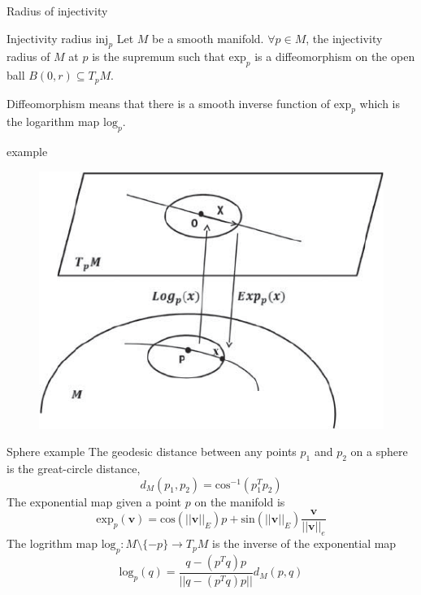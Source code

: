 \documentclass{beamer}
\begin{document}
\begin{frame}{Radius of injectivity}
\begin{alertblock}{Injectivity radius $\text{inj}_{p}$}
   Let $M$ be a smooth manifold. $\forall p \in M$, the {\color{blue} injectivity radius} of $M$ at $p$ is the supremum such that $\text{exp}_{p}$ is a diffeomorphism on the open ball $B(0,r) \subseteq T_{p}M$.
  \end{alertblock}
  Diffeomorphism means that there is a smooth inverse function of $\text{exp}_{p}$ which is the logarithm map $\text{log}_{p}$.
\end{frame}
\begin{frame}{example}
\begin{figure}
\includegraphics[scale = 0.5]{logmap.png}
\end{figure}
\end{frame}



\begin{frame}{Sphere example}
The geodesic distance between any points $p_{1}$ and $p_{2}$ on a sphere is the great-circle distance,
\begin{equation*}
  d_{M}(p_{1},p_{2}) = \text{cos}^{-1}(p_{1}^{T}p_{2})
\end{equation*}
The exponential map given a point $p$ on the manifold is 
\begin{equation*}
  \text{exp}_{p}(\bm{v}) = \text{cos}(||\bm{v}||_{E})p + \text{sin}(||\bm{v}||_{E})\frac{\bm{v}}{||\bm{v}||_{e}}
\end{equation*}
The logrithm map $\text{log}_{p}:M \setminus\{-p\} \rightarrow T_{p}M$ is the inverse of the exponential map 
\begin{equation*}
  \text{log}_{p}(q) = \frac{q-(p^{T}q)p}{||q-(p^{T}q)p||}d_{M}(p,q)
\end{equation*}
\end{frame}
\end{document}
